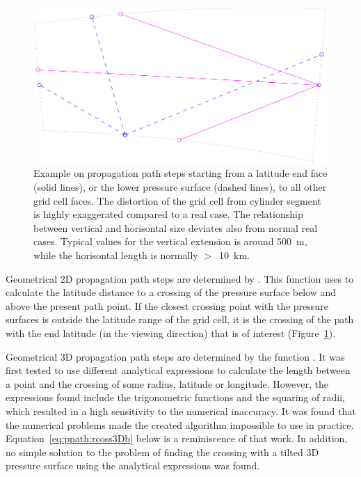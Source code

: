 \begin{figure}[!t]
 \begin{center}
  \includegraphics*[width=0.80\hsize]{Figs/ppath/ppath_ex3}
  \caption{Example on propagation path steps starting from a latitude end face 
    (solid lines), or the lower pressure surface (dashed lines), to
    all other grid cell faces. The distortion of the grid cell from
    cylinder segment is highly exaggerated compared to a real case.
    The relationship between vertical and horisontal size deviates
    also from normal real cases.  Typical values for the vertical
    extension is around 500~m, while the horisontal length is
    normally $>$~10~km.}
  \label{fig:ppath:ex3}  
 \end{center}
\end{figure}

Geometrical 2D propagation path steps are determined by
. This function uses
 to calculate the latitude distance
to a crossing of the pressure surface below and above the present path
point. If the closest crossing point with the pressure surfaces is
outside the latitude range of the grid cell, it is the crossing of the
path with the end latitude (in the viewing direction) that is of
interest (Figure~\ref{fig:ppath:ex3}).



\label{sec:ppath:3Dgeom}

Geometrical 3D propagation path steps are determined by the function
. It was first tested to use different
analytical expressions to calculate the length between a point and
the crossing of some radius, latitude or longitude. However, the
expressions found include the trigonometric functions and the squaring
of radii, which resulted in a high sensitivity to the numerical
inaccuracy. It was found that the numerical problems made the created
algorithm impossible to use in practice.
Equation~\ref{eq:ppath:rcoss3Db} below is a reminiscence of that work.
In addition, no simple solution to the problem of finding the crossing
with a tilted 3D pressure surface using the analytical expressions was
found.

